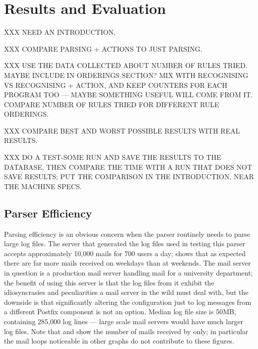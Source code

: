 \chapter{Results and Evaluation}

\label{Results}

XXX NEED AN INTRODUCTION\@.

XXX COMPARE PARSING + ACTIONS TO JUST PARSING\@.

XXX USE THE DATA COLLECTED ABOUT NUMBER OF RULES TRIED\@.  MAYBE INCLUDE IN
ORDERINGS SECTION\@?  MIX WITH RECOGNISING VS RECOGNISING + ACTION, AND
KEEP COUNTERS FOR EACH PROGRAM TOO --- MAYBE SOMETHING USEFUL WILL COME
FROM IT\@.  COMPARE NUMBER OF RULES TRIED FOR DIFFERENT RULE ORDERINGS\@.

XXX COMPARE BEST AND WORST POSSIBLE RESULTS WITH REAL RESULTS\@.

XXX DO A TEST-SOME RUN AND SAVE THE RESULTS TO THE DATABASE, THEN COMPARE
THE TIME WITH A RUN THAT DOES NOT SAVE RESULTS\@; PUT THE COMPARISON IN THE
INTRODUCTION, NEAR THE MACHINE SPECS\@.

\section{Parser Efficiency}

\label{parser efficiency}

Parsing efficiency is an obvious concern when the parser routinely needs to
parse large log files.  The server that generated the log files used in
testing this parser accepts approximately 10,000 mails for 700 users a day;
 shows that as expected there are far more
mails received on weekdays than at weekends.  The mail server in question
is a production mail server handling mail for a university department; the
benefit of using this server is that the log files from it exhibit the
idiosyncrasies and peculiarities a mail server in the wild must deal with,
but the downside is that significantly altering the configuration just to
log messages from a different Postfix component is not an option.  Median
log file size is 50MB, containing 285,000 log lines --- large scale mail
servers would have much larger log files.  Note that  and  show the number of mails received by  only; in
particular the mail loops noticeable in other graphs do not contribute to
these figures.


